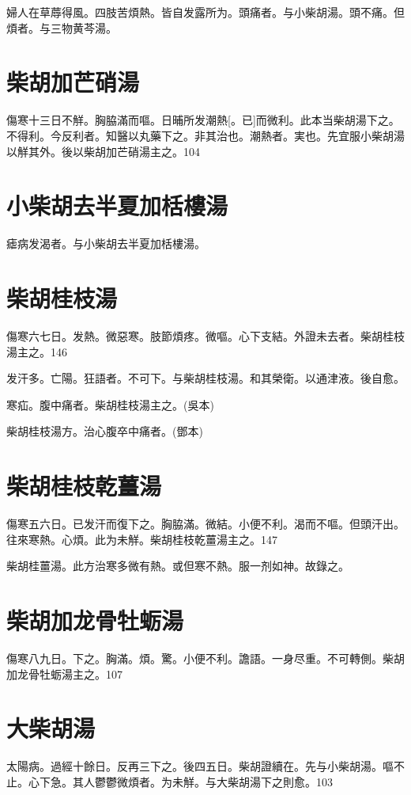 \documentclass[12pt,twoside,UTF8,b5paper]{ctexbook}
\begin{document}
婦人在草蓐得風。四肢苦煩熱。皆自发露所为。頭痛者。与小柴胡湯。頭不痛。但煩者。与三物黄芩湯。

\section{柴胡加芒硝湯}

傷寒十三日不觧。胸脇滿而嘔。日晡所发潮熱[。已]而微利。此本当柴胡湯下之。不得利。今反利者。知醫以丸藥下之。非其治也。潮熱者。実也。先宜服小柴胡湯以觧其外。後以柴胡加芒硝湯主之。104

\section{小柴胡去半夏加栝樓湯}

瘧病发渴者。与小柴胡去半夏加栝樓湯。

\section{柴胡桂枝湯}

傷寒六七日。发熱。微惡寒。肢節煩疼。微嘔。心下支結。外證未去者。柴胡桂枝湯主之。146

发汗多。亡陽。狂語者。不可下。与柴胡桂枝湯。和其榮衛。以通津液。後自愈。

寒疝。腹中痛者。柴胡桂枝湯主之。(吳本)

柴胡桂枝湯方。治心腹卒中痛者。(鄧本)

\section{柴胡桂枝乾薑湯}

傷寒五六日。已发汗而復下之。胸脇滿。微結。小便不利。渴而不嘔。但頭汗出。往來寒熱。心煩。此为未觧。柴胡桂枝乾薑湯主之。147

柴胡桂薑湯。此方治寒多微有熱。或但寒不熱。服一剂如神。故錄之。

\section{柴胡加龙骨牡蛎湯}

傷寒八九日。下之。胸滿。煩。驚。小便不利。譫語。一身尽重。不可轉側。柴胡加龙骨牡蛎湯主之。107

\section{大柴胡湯}

太陽病。過經十餘日。反再三下之。後四五日。柴胡證續在。先与小柴胡湯。嘔不止。心下急。其人鬱鬱微煩者。为未觧。与大柴胡湯下之則愈。103
\end{document}
